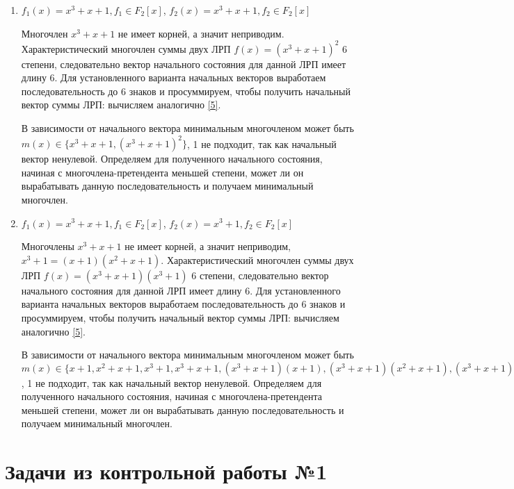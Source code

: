 \documentclass[utf8x, 14pt]{G7-32} %
\begin{document}
\begin{enumerate}
     \item $f_1(x) = x^3+x+1, f_1\in F_2[x]$, $f_2(x) = x^3+x+1, f_2\in F_2[x]$
    
     Многочлен $x^3+x+1$ не имеет корней, а значит неприводим. Характеристический многочлен суммы двух ЛРП $f(x) = (x^3+x+1)^2$ 6 степени, следовательно вектор начального состояния для данной ЛРП имеет длину 6. Для установленного варианта начальных векторов выработаем последовательность до 6 знаков и просуммируем, чтобы получить начальный вектор суммы ЛРП: вычисляем аналогично \ref{5}.
     
     В зависимости от начального вектора минимальным многочленом может быть $m(x)\in\{x^3+x+1, (x^3+x+1)^2\}$, 1 не подходит, так как начальный вектор ненулевой. Определяем для полученного начального состояния, начиная с многочлена-претендента меньшей степени, может ли он вырабатывать данную последовательность и получаем минимальный многочлен.
     
     \item $f_1(x) = x^3+x+1, f_1\in F_2[x]$, $f_2(x) = x^3+1, f_2\in F_2[x]$
    
     Многочлены $x^3+x+1$  не имеет корней, а значит неприводим, $x^3+1 = (x+1)(x^2+x+1)$. Характеристический многочлен суммы двух ЛРП $f(x) = (x^3+x+1)(x^3+1)$ 6 степени, следовательно вектор начального состояния для данной ЛРП имеет длину 6. Для установленного варианта начальных векторов выработаем последовательность до 6 знаков и просуммируем, чтобы получить начальный вектор суммы ЛРП: вычисляем аналогично \ref{5}.
     
     В зависимости от начального вектора минимальным многочленом может быть $m(x)\in\{x+1, x^2+x+1, x^3+1, x^3+x+1, (x^3+x+1)(x+1), (x^3+x+1)(x^2+x+1), (x^3+x+1)(x^3+1)\}$, 1 не подходит, так как начальный вектор ненулевой. Определяем для полученного начального состояния, начиная с многочлена-претендента меньшей степени, может ли он вырабатывать данную последовательность и получаем минимальный многочлен.
\end{enumerate}
\section{Задачи из контрольной работы №1}
\end{document}
